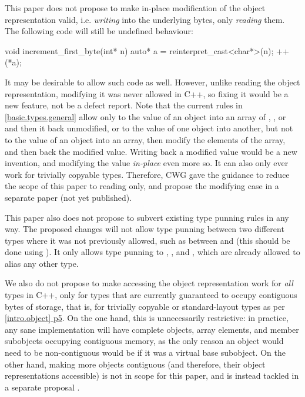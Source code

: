This paper does not propose to make in-place modification of the object representation valid, i.e. \emph{writing} into the underlying bytes, only \emph{reading} them. The following code will still be undefined behaviour:

\begin{codeblock}
void increment_first_byte(int* n) {
  auto* a = reinterpret_cast<char*>(n);
  ++(*a);
}
\end{codeblock}

It may be desirable to allow such code as well. However, unlike reading the object representation, modifying it was never allowed in C++, so fixing it would be a new feature, not be a defect report. Note that the current rules in \href{https://timsong-cpp.github.io/cppwp/n4861/basic.types.general}{[basic.types.general]} allow only to  the value of an object into an array of , , or  and then  it back unmodified, or to  the value of one object into another, but not to  the value of an object into an array, then modify the elements of the array, and then  back the modified value. Writing back a modified value would be a new invention, and modifying the value \emph{in-place} even more so. It can also only ever work for trivially copyable types. Therefore, CWG gave the guidance to reduce the scope of this paper to reading only, and propose the modifying case in a separate paper (not yet published).

This paper also does not propose to subvert existing type punning rules in any way. The proposed changes will not allow type punning between two different types where it was not previously allowed, such as between  and  (this should be done using ). It only allows type punning to , , and , which are already allowed to alias any other type.

We also do not propose to make accessing the object representation work for \emph{all} types in C++, only for types that are currently guaranteed to occupy contiguous bytes of storage, that is, for trivially copyable or standard-layout types as per \href{https://timsong-cpp.github.io/cppwp/n4861/intro.object#8.sentence-5}{[intro.object] p5}. On the one hand, this is unnecessarily restrictive: in practice, any sane implementation will have complete objects, array elements, and member subobjects occupying contiguous memory, as the only reason an object would need to be non-contiguous would be if it was a virtual base subobject. On the other hand, making more objects contiguous (and therefore, their object representations accessible) is not in scope for this paper, and is instead tackled in a separate proposal \cite{P1945R0}.

